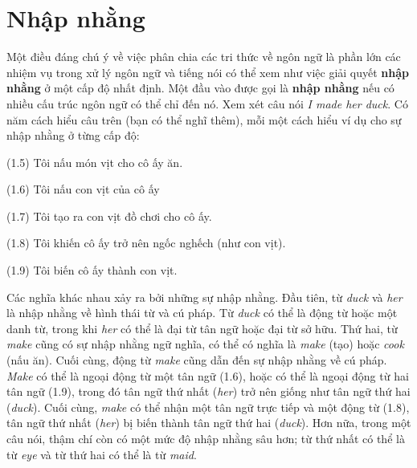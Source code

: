 \section{Nhập nhằng}

Một điều đáng chú ý về việc phân chia các tri thức về ngôn ngữ là phần lớn các nhiệm vụ trong xử lý ngôn ngữ và tiếng nói có thể xem như việc giải quyết \textbf{nhập nhằng} ở một cấp độ nhất định. Một đầu vào được gọi là \textbf{nhập nhằng} nếu có nhiều cấu trúc ngôn ngữ có thể chỉ đến nó. Xem xét câu nói \textit{I made her duck}. Có năm cách hiểu câu trên (bạn có thể nghĩ thêm), mỗi một cách hiểu ví dụ cho sự nhập nhằng ở từng cấp độ:

\noindent
(1.5) Tôi nấu món vịt cho cô ấy ăn.

\noindent
(1.6) Tôi nấu con vịt của cô ấy

\noindent
(1.7) Tôi tạo ra con vịt đồ chơi cho cô ấy.

\noindent
(1.8) Tôi khiến cô ấy trở nên ngốc nghếch (như con vịt).

\noindent
(1.9) Tôi biến cô ấy thành con vịt.

Các nghĩa khác nhau xảy ra bởi những sự nhập nhằng. Đầu tiên, từ \textit{duck} và \textit{her} là nhập nhằng về hình thái từ và cú pháp. Từ \textit{duck} có thể là động từ hoặc một danh từ, trong khi \textit{her} có thể là đại từ tân ngữ hoặc đại từ sở hữu. Thứ hai, từ \textit{make} cũng có sự nhập nhằng ngữ nghĩa, có thể có nghĩa là \textit{make} (tạo) hoặc \textit{cook} (nấu ăn). Cuối cùng, động từ \textit{make} cũng dẫn đến sự nhập nhằng về cú pháp. \textit{Make} có thể là ngoại động từ một tân ngữ (1.6), hoặc có thể là ngoại động từ hai tân ngữ (1.9), trong đó tân ngữ thứ nhất (\textit{her}) trở nên giống như tân ngữ thứ hai (\textit{duck}). Cuối cùng, \textit{make} có thể nhận một tân ngữ trực tiếp và một động từ (1.8), tân ngữ thứ nhất (\textit{her}) bị biến thành tân ngữ thứ hai (\textit{duck}). Hơn nữa, trong một câu nói, thậm chí còn có một mức độ nhập nhằng sâu hơn; từ thứ nhất có thể là từ \textit{eye} và từ thứ hai có thể là từ \textit{maid}.


